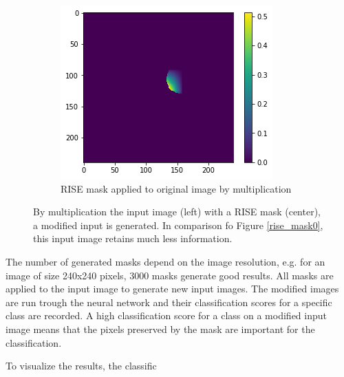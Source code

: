 \begin{figure}[H]
\begin{subfigure}[t]{.32\textwidth}
    \end{subfigure}\hfill%
    \begin{subfigure}[t]{.32\textwidth}
        \centering
        \includegraphics[width=\linewidth]{chapters/02_methods/images/rise/rise1_applied.png}
        \caption{RISE mask applied to original image by multiplication}
    \end{subfigure}
    \caption{By multiplication the input image (left) with a RISE mask (center), a modified input is generated. In comparison fo Figure \ref{rise_mask0}, this input image retains much less information.}
    \label{rise_mask1}
\end{figure}

The number of generated masks depend on the image resolution, e.g. for an image of size 240x240 pixels, 3000 masks generate good results. All masks are applied to the input image to generate new input images. The modified images are run trough the neural network and their classification scores for a specific class are recorded. A high classification score for a class on a modified input image means that the pixels preserved by the mask are important for the classification.

To visualize the results, the classific

